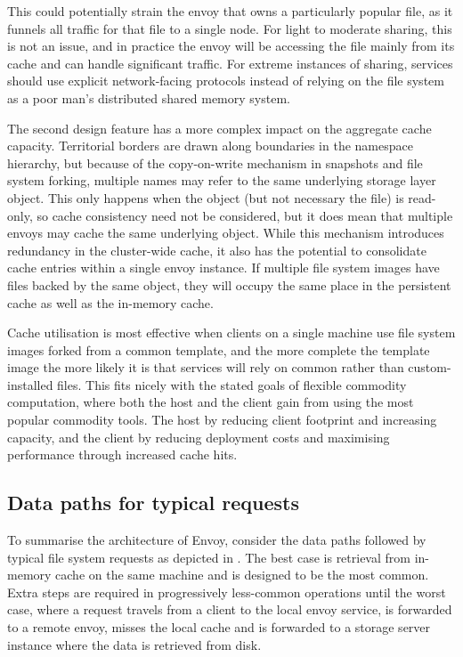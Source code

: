 This could potentially strain the envoy that owns a particularly popular file, as it funnels all traffic for that file to a single node. For light to moderate sharing, this is not an issue, and in practice the envoy will be accessing the file mainly from its cache and can handle significant traffic. For extreme instances of sharing, services should use explicit network-facing protocols instead of relying on the file system as a poor man's distributed shared memory system.

The second design feature has a more complex impact on the aggregate cache capacity. Territorial borders are drawn along boundaries in the namespace hierarchy, but because of the copy-on-write mechanism in snapshots and file system forking, multiple names may refer to the same underlying storage layer object. This only happens when the object (but not necessary the file) is read-only, so cache consistency need not be considered, but it does mean that multiple envoys may cache the same underlying object. While this mechanism introduces redundancy in the cluster-wide cache, it also has the potential to consolidate cache entries within a single envoy instance. If multiple file system images have files backed by the same object, they will occupy the same place in the persistent cache as well as the in-memory cache.

Cache utilisation is most effective when clients on a single machine use file system images forked from a common template, and the more complete the template image the more likely it is that services will rely on common rather than custom-installed files. This fits nicely with the stated goals of flexible commodity computation, where both the host and the client gain from using the most popular commodity tools. The host by reducing client footprint and increasing capacity, and the client by reducing deployment costs and maximising performance through increased cache hits.

\subsection{Data paths for typical requests}\label{sec:data-paths}

To summarise the architecture of Envoy, consider the data paths followed by typical file system requests as depicted in . The best case is retrieval from in-memory cache on the same machine and is designed to be the most common. Extra steps are required in progressively less-common operations until the worst case, where a request travels from a client to the local envoy service, is forwarded to a remote envoy, misses the local cache and is forwarded to a storage server instance where the data is retrieved from disk.

